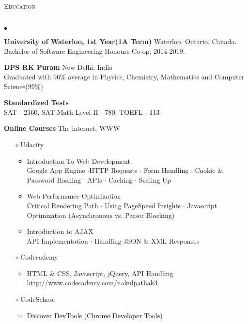 \documentclass{article}
\newcommand{\lineunder}{\vspace*{-8pt} \\ \hspace*{-18pt} \hrulefill \\}
\newcommand{\header}[1]{{\hspace*{-15pt}\vspace*{6pt} \textsc{#1}} \vspace*{-6pt} \lineunder}
\newenvironment{achievements}{\begin{list}{$\bullet$}{\topsep 0pt \itemsep -1.5pt \leftmargin 5pt}}{\vspace*{4pt}\end{list}}
\begin{document}
\vspace{7pt}

\header{\normalsize Education}
\begin{achievements}
\item \textbf{University of Waterloo, 1st Year(1A Term)} Waterloo, Ontario, Canada. \\ Bachelor of Software Engineering Honours Co-op, 2014-2019. 
\item \textbf{DPS RK Puram} New Delhi, India \\ Graduated with 96\% average in Physics, Chemistry, Mathematics and Computer Science(99\%)
\item \textbf{Standardized Tests} \\ SAT - 2360, SAT Math Level II - 780, TOEFL - 113
\item \textbf{Online Courses} The internet, WWW
\vspace{-4pt}
\begin{itemize}\item[$\circ$] Udacity
	\begin{itemize}
	\vspace{-2pt}
	\item Introduction To Web Development
	\\  Google App Engine $\cdot$HTTP Requests  $\cdot$ Form Handling $\cdot$ Cookie \& Password Hashing $\cdot$ APIs $\cdot$ Caching $\cdot$ Scaling Up
	\vspace{-2pt}
	\item Web Performance Optimization
	\\ Critical Rendering Path $\cdot$ Using PageSpeed Insights $\cdot$ Javascript Optimization (Asynchronous vs. Parser Blocking)
	\vspace{-2pt}
	\item Introduction to AJAX
	\\ API Implementation $\cdot$ Handling JSON \& XML Responses 
	\end{itemize}
	\vspace{-3.5pt}
	\item[$\circ$] Codecademy
	\begin{itemize}
	\vspace{-2pt}
	\item HTML \& CSS, Javascript, jQuery, API Handling 
	\\ \url{http://www.codecademy.com/nakulpathak3}
	\end{itemize}
	\vspace{-3.5pt}
\item[$\circ$] CodeSchool
	\begin{itemize}
	\vspace{-2pt}
	\item Discover DevTools (Chrome Developer Tools)
	\end{itemize}
	\end{itemize}
\end{achievements}
\end{document}
